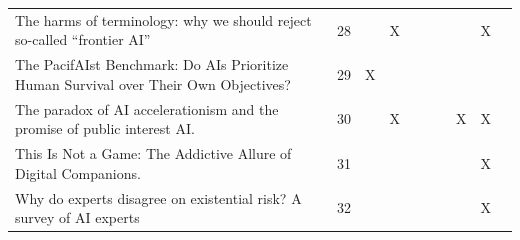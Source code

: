 \begin{landscape}
\begin{longtable}{|p{17cm}|c|c|c|c|c|c|c|c|c|}
		The harms of terminology: why we should reject so-called “frontier AI”                                                                                  & 28          &                                    & X                                                         &                                                       &                                                            &                                           &                                              & X                                                  &                                    \\
		The PacifAIst Benchmark: Do AIs Prioritize Human Survival over Their Own Objectives?                                                                    & 29          & X                                  &                                                           &                                                       &                                                            &                                           &                                              &                                                    &                                    \\
		The paradox of AI accelerationism and the promise of public interest AI.                                                                                & 30          &                                    & X                                                         &                                                       &                                                            &                                           & X                                            & X                                                  &                                    \\
		This Is Not a Game: The Addictive Allure of Digital Companions.                                                                                         & 31          &                                    &                                                           &                                                       &                                                            &                                           &                                              & X                                                  &                                    \\
		Why do experts disagree on existential risk? A survey of AI experts                                                                                     & 32          &                                    &                                                           &                                                       &                                                            &                                           &                                              & X                                                  &                                    \\

\end{longtable}
\end{landscape}
